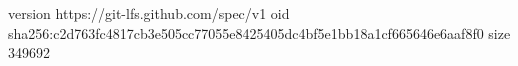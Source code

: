 version https://git-lfs.github.com/spec/v1
oid sha256:c2d763fc4817cb3e505cc77055e8425405dc4bf5e1bb18a1cf665646e6aaf8f0
size 349692
